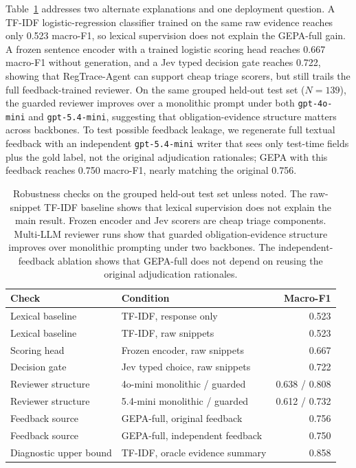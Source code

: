 \documentclass[11pt]{article}
\newcommand{\framework}{RegTrace-Agent}
\begin{document}
Table~\ref{tab:robustness} addresses two alternate explanations and one deployment question. A TF-IDF logistic-regression classifier trained on the same raw evidence reaches only 0.523 macro-F1, so lexical supervision does not explain the GEPA-full gain. A frozen sentence encoder with a trained logistic scoring head reaches 0.667 macro-F1 without generation, and a Jev typed decision gate reaches 0.722, showing that \framework{} can support cheap triage scorers, but still trails the full feedback-trained reviewer. On the same grouped held-out test set ($N=139$), the guarded reviewer improves over a monolithic prompt under both \texttt{gpt-4o-mini} and \texttt{gpt-5.4-mini}, suggesting that obligation-evidence structure matters across backbones. To test possible feedback leakage, we regenerate full textual feedback with an independent \texttt{gpt-5.4-mini} writer that sees only test-time fields plus the gold label, not the original adjudication rationales; GEPA with this feedback reaches 0.750 macro-F1, nearly matching the original 0.756.

\begin{table}[t]
\centering
\scriptsize
\setlength{\tabcolsep}{3pt}
\begin{tabular}{llr}
\toprule
\textbf{Check} & \textbf{Condition} & \textbf{Macro-F1} \\
\midrule
Lexical baseline & TF-IDF, response only & 0.523 \\
Lexical baseline & TF-IDF, raw snippets & 0.523 \\
Scoring head & Frozen encoder, raw snippets & 0.667 \\
Decision gate & Jev typed choice, raw snippets & 0.722 \\
Reviewer structure & 4o-mini monolithic / guarded & 0.638 / 0.808 \\
Reviewer structure & 5.4-mini monolithic / guarded & 0.612 / 0.732 \\
Feedback source & GEPA-full, original feedback & 0.756 \\
Feedback source & GEPA-full, independent feedback & 0.750 \\
Diagnostic upper bound & TF-IDF, oracle evidence summary & 0.858 \\
\bottomrule
\end{tabular}
\caption{Robustness checks on the grouped held-out test set unless noted. The raw-snippet TF-IDF baseline shows that lexical supervision does not explain the main result. Frozen encoder and Jev scorers are cheap triage components. Multi-LLM reviewer runs show that guarded obligation-evidence structure improves over monolithic prompting under two backbones. The independent-feedback ablation shows that GEPA-full does not depend on reusing the original adjudication rationales.}
\label{tab:robustness}
\end{table}
\end{document}
